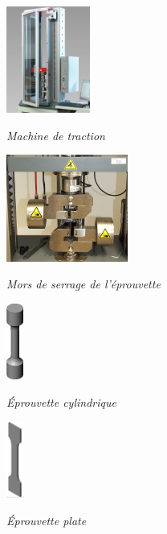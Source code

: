 \documentclass[11pt,oneside]{article}
\begin{document}
\begin{minipage}[c]{.2\linewidth}
\begin{center}
\includegraphics[height=3.5cm]{png/traction}

\textit{Machine de traction}
\end{center}
\end{minipage} \hfill
\begin{minipage}[c]{.2\linewidth}
\begin{center}
\includegraphics[height=3.5cm]{png/mors}

\textit{Mors de serrage de l'éprouvette}
\end{center}
\end{minipage} \hfill
\begin{minipage}[c]{.2\linewidth}
\begin{center}
\includegraphics[height=2.5cm]{png/eprouvette_cyl}

\textit{Éprouvette cylindrique}
\end{center}
\end{minipage} \hfill
\begin{minipage}[c]{.2\linewidth}
\begin{center}
\includegraphics[height=2.5cm]{png/eprouvette_plate}

\textit{Éprouvette plate}
\end{center}
\end{minipage} 
\end{document}
